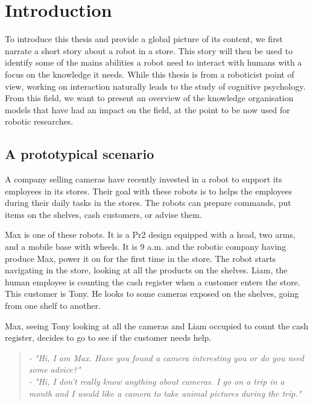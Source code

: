 
\ifdefined{}
\else
\setcounter{chapter}{0} %
\dominitoc
\faketableofcontents
\fi

\chapter{Introduction}
\minitoc

To introduce this thesis and provide a global picture of its content, we first narrate a short story about a robot in a store. This story will then be used to identify some of the mains abilities a robot need to interact with humans with a focus on the knowledge it needs. While this thesis is from a roboticist point of view, working on interaction naturally leads to the study of cognitive psychology. From this field, we want to present an overview of the knowledge organisation models that have had an impact on the field, at the point to be now used for robotic researches.

\section{A prototypical scenario}

A company selling cameras have recently invested in a robot to support its employees in its stores. Their goal with these robots is to helps the employees during their daily tasks in the stores. The robots can prepare commands, put items on the shelves, cash customers, or advise them.

Max is one of these robots. It is a Pr2 design equipped with a head, two arms, and a mobile base with wheels. It is 9 a.m. and the robotic company having produce Max, power it on for the first time in the store. The robot starts navigating in the store, looking at all the products on the shelves. Liam, the human employee is counting the cash register when a customer enters the store. This customer is Tony. He looks to some cameras exposed on the shelves, going from one shelf to another.

Max, seeing Tony looking at all the cameras and Liam occupied to count the cash register, decides to go to see if the customer needs help.

\begin{quote} 
\centering 
\textit{
- "Hi, I am Max. Have you found a camera interesting you or do you need some advice?" \\
- "Hi, I don't really know anything about cameras. I go on a trip in a month and I would like a camera to take animal pictures during the trip." }
\end{quote}

